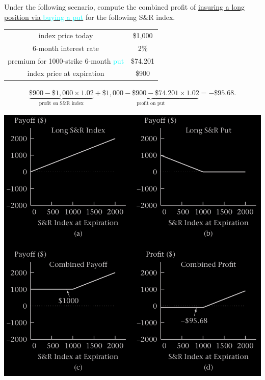 \begin{frame}[fragile]
	\begin{myexample}
		Under the following scenario, compute the combined profit of \underline{insuring a long
		position via \textcolor{cyan}{buying a put}} for the following S\&R index.
	\begin{center}
		\renewcommand{\arraystretch}{1.2}
		\begin{tabular}{|c|c|}
			\hline
			index price today                                     & \$1,000  \\
			6-month interest rate                                 & 2\%      \\
			premium for 1000-strike 6-month \textcolor{cyan}{put} & \$74.201 \\ \hline
			index price at expiration                             & \$900    \\ \hline
		\end{tabular}
	\end{center}
	\end{myexample}
	\vfill
	\pause
	\begin{mysol}
		\begin{align*}
			\underbrace{\$900 - \$1,000 \times 1.02}_{\text{profit on S\&R index}} +
			\underbrace{\$1,000-\$900 -\$74.201 \times 1.02}_{\text{profit on put}} = -\$95.68.
		\end{align*}
		\myEnd
	\end{mysol}
\end{frame}
\begin{frame}[fragile,t]
	\begin{center}
		\includegraphics[scale=0.25]{figs/Figure-3-1.png}
	\end{center}
\end{frame}

